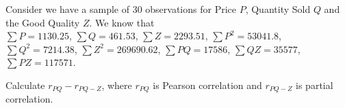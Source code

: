 
\begin{question}
Consider we have a sample of 30 observations for Price \(P\), Quantity Sold \(Q\) and the Good Quality \(Z\).
We know that\\
\(\sum{P} = 1130.25\),
\(\sum{Q} = 461.53\),
\(\sum{Z} = 2293.51\),
\(\sum{P^2} = 53041.8\),
\(\sum{Q^2} = 7214.38\),
\(\sum{Z^2} = 269690.62\),
\(\sum{PQ} = 17586\),
\(\sum{QZ} = 35577\),
\(\sum{PZ} = 117571\).

Calculate \(r_{PQ} - r_{PQ-Z}\), where \(r_{PQ}\) is Pearson correlation and \(r_{PQ-Z}\) is partial correlation.
\end{question}


